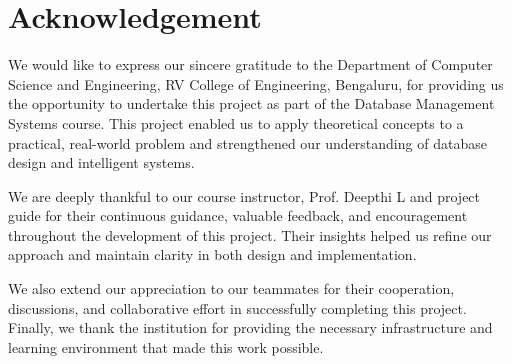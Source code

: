 
\newpage
\chapter*{Acknowledgement}

We would like to express our sincere gratitude to the Department of Computer Science and Engineering, RV College of Engineering, Bengaluru, for providing us the opportunity to undertake this project as part of the Database Management Systems course. This project enabled us to apply theoretical concepts to a practical, real-world problem and strengthened our understanding of database design and intelligent systems.

We are deeply thankful to our course instructor, Prof. Deepthi L and project guide for their continuous guidance, valuable feedback, and encouragement throughout the development of this project. Their insights helped us refine our approach and maintain clarity in both design and implementation.

We also extend our appreciation to our teammates for their cooperation, discussions, and collaborative effort in successfully completing this project. Finally, we thank the institution for providing the necessary infrastructure and learning environment that made this work possible.
